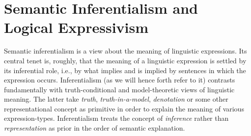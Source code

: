 \documentclass{article}
\date{}
\begin{document}
\setlength{\parindent}{1cm}
\large
\doublespacing
%



\section{Semantic Inferentialism and Logical Expressivism}


Semantic inferentialism is a view about the meaning of linguistic expressions. Its central tenet is, roughly, that the meaning of a linguistic expression is settled by its inferential role, i.e., by what implies and is implied by sentences in which the expression occurs. Inferentialism (as we will hence forth refer to it) contrasts fundamentally with truth-conditional and model-theoretic views of linguistic meaning. The latter take \textit{truth}, \textit{truth-in-a-model}, \textit{denotation} or some other representational concept as primitive in order to explain the meaning of various expression-types. Inferentialism treats the concept of \textit{inference} rather than \textit{representation} as prior in the order of semantic explanation.
\end{document}
